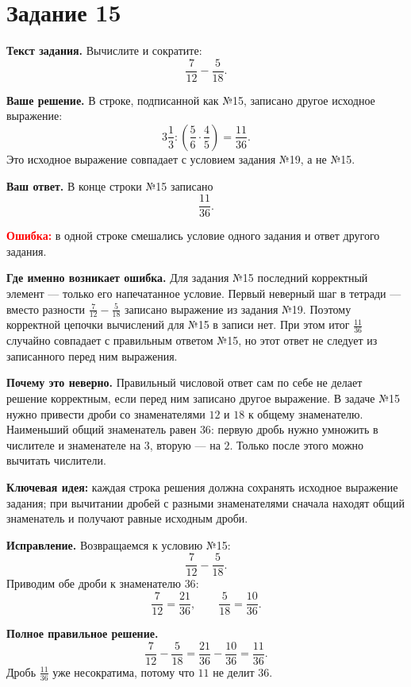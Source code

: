 \documentclass[12pt,a4paper]{article}
\begin{document}
\newpage
{}\label{task:15}
\section*{Задание 15}

\textbf{Текст задания.}
Вычислите и сократите:
\[
\frac{7}{12}-\frac{5}{18}.
\]

\textbf{Ваше решение.}
В строке, подписанной как №15, записано другое исходное выражение:
\[
3\frac13:\left(\frac56\cdot\frac45\right)=\frac{11}{36}.
\]
Это исходное выражение совпадает с условием задания №19, а не №15.

\textbf{Ваш ответ.}
В конце строки №15 записано
\[
\frac{11}{36}.
\]

\textcolor{red}{\textbf{Ошибка:}} в одной строке смешались условие одного задания и ответ другого задания.

\textbf{Где именно возникает ошибка.}
Для задания №15 последний корректный элемент --- только его напечатанное условие. Первый неверный шаг в тетради --- вместо разности $\frac{7}{12}-\frac{5}{18}$ записано выражение из задания №19. Поэтому корректной цепочки вычислений для №15 в записи нет. При этом итог $\frac{11}{36}$ случайно совпадает с правильным ответом №15, но этот ответ не следует из записанного перед ним выражения.

\textbf{Почему это неверно.}
Правильный числовой ответ сам по себе не делает решение корректным, если перед ним записано другое выражение. В задаче №15 нужно привести дроби со знаменателями $12$ и $18$ к общему знаменателю. Наименьший общий знаменатель равен $36$: первую дробь нужно умножить в числителе и знаменателе на $3$, вторую --- на $2$. Только после этого можно вычитать числители.

\textcolor{blue!60!black}{\textbf{Ключевая идея:}} каждая строка решения должна сохранять исходное выражение задания; при вычитании дробей с разными знаменателями сначала находят общий знаменатель и получают равные исходным дроби.

\textbf{Исправление.}
Возвращаемся к условию №15:
\[
\frac{7}{12}-\frac{5}{18}.
\]
Приводим обе дроби к знаменателю $36$:
\[
\frac{7}{12}=\frac{21}{36},
\qquad
\frac{5}{18}=\frac{10}{36}.
\]

\textbf{Полное правильное решение.}
\[
\frac{7}{12}-\frac{5}{18}
=\frac{21}{36}-\frac{10}{36}
=\frac{11}{36}.
\]
Дробь $\frac{11}{36}$ уже несократима, потому что $11$ не делит $36$.
\end{document}
